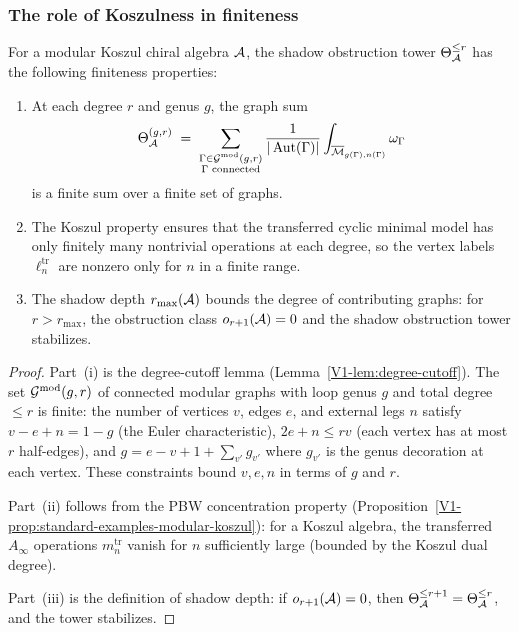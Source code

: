 \subsubsection{The role of Koszulness in finiteness}

\begin{proposition}
For a modular Koszul chiral algebra $\mathcal{A}$, the shadow obstruction tower $\Theta_{\mathcal{A}}^{\leq r}$ has the following finiteness properties:
\begin{enumerate}[label=\textup{(\roman*)}]
\item At each degree $r$ and genus $g$, the graph sum
 \begin{equation}%
 \Theta_\cA^{(g,r)} \;=\; \sum_{\substack{\Gamma \in \Gmod(g,r) \\ \Gamma \text{ connected}}} \frac{1}{|\Aut(\Gamma)|} \int_{\overline{\mathcal{M}}_{g(\Gamma),n(\Gamma)}} \omega_\Gamma
 \end{equation}
 is a finite sum over a finite set of graphs.
\item The Koszul property ensures that the transferred cyclic minimal model has only finitely many nontrivial operations at each degree, so the vertex labels $\ell_n^{\mathrm{tr}}$ are nonzero only for $n$ in a finite range.
\item The shadow depth $r_{\max}(\mathcal{A})$ bounds the degree of contributing graphs: for $r > r_{\max}$, the obstruction class $o_{r+1}(\mathcal{A}) = 0$ and the shadow obstruction tower stabilizes.
\end{enumerate}
\end{proposition}

\begin{proof}
Part~(i) is the degree-cutoff lemma (Lemma~\ref{V1-lem:degree-cutoff}). The set $\mathcal{G}^{\mathrm{mod}}(g,r)$ of connected modular graphs with loop genus $g$ and total degree $\leq r$ is finite: the number of vertices $v$, edges $e$, and external legs $n$ satisfy $v - e + n = 1 - g$ (the Euler characteristic), $2e + n \leq rv$ (each vertex has at most $r$ half-edges), and $g = e - v + 1 + \sum_{v'} g_{v'}$ where $g_{v'}$ is the genus decoration at each vertex. These constraints bound $v, e, n$ in terms of $g$ and $r$.

Part~(ii) follows from the PBW concentration property (Proposition~\ref{V1-prop:standard-examples-modular-koszul}): for a Koszul algebra, the transferred $A_\infty$ operations $m_n^{\mathrm{tr}}$ vanish for $n$ sufficiently large (bounded by the Koszul dual degree).

Part~(iii) is the definition of shadow depth: if $o_{r+1}(\mathcal{A}) = 0$, then $\Theta_{\mathcal{A}}^{\leq r+1} = \Theta_{\mathcal{A}}^{\leq r}$, and the tower stabilizes.
\end{proof}

